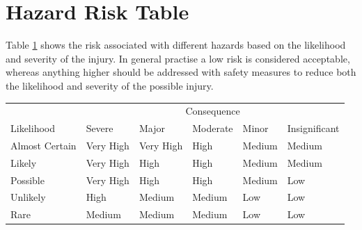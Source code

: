 \documentclass[]{report}
\begin{document}
\section{Hazard Risk Table}
Table \ref{RiskMatrixTable} shows the risk associated with different hazards based on the likelihood and severity of the injury. In general practise a low risk is considered acceptable, whereas anything higher should be addressed with safety measures to reduce both the likelihood and severity of the possible injury.

\begin{table}[h]
	\begin{tabular}{|l|lllll}
		\hline
		& \multicolumn{5}{c|}{Consequence}                                                                                                                                                                                                                           \\ \cline{2-6} 
		\multirow{-2}{*}{Likelihood} & \multicolumn{1}{l|}{\cellcolor[HTML]{FFFFFF}Severe} & \multicolumn{1}{l|}{\cellcolor[HTML]{FFFFFF}Major} & \multicolumn{1}{l|}{\cellcolor[HTML]{FFFFFF}Moderate} & \multicolumn{1}{l|}{\cellcolor[HTML]{FFFFFF}Minor} & \multicolumn{1}{l|}{Insignificant} \\ \hline
		Almost Certain               & \cellcolor[HTML]{FE0000}Very High                   & \cellcolor[HTML]{FE0000}Very High                  & \cellcolor[HTML]{F56B00}High                          & \cellcolor[HTML]{F8FF00}Medium                     & \cellcolor[HTML]{F8FF00}Medium     \\ \cline{1-1}
		Likely                       & \cellcolor[HTML]{FE0000}Very High                   & \cellcolor[HTML]{F56B00}High                       & \cellcolor[HTML]{F56B00}High                          & \cellcolor[HTML]{F8FF00}Medium                     & \cellcolor[HTML]{F8FF00}Medium     \\ \cline{1-1}
		Possible                     & \cellcolor[HTML]{FE0000}Very High                   & \cellcolor[HTML]{F56B00}High                       & \cellcolor[HTML]{F56B00}High                          & \cellcolor[HTML]{FCFF2F}Medium                     & \cellcolor[HTML]{32CB00}Low        \\ \cline{1-1}
		Unlikely                     & \cellcolor[HTML]{F56B00}High                        & \cellcolor[HTML]{F8FF00}Medium                     & \cellcolor[HTML]{F8FF00}Medium                        & \cellcolor[HTML]{32CB00}Low                        & \cellcolor[HTML]{32CB00}Low        \\ \cline{1-1}
		Rare                         & \cellcolor[HTML]{F8FF00}Medium                      & \cellcolor[HTML]{F8FF00}Medium                     & \cellcolor[HTML]{F8FF00}Medium                        & \cellcolor[HTML]{32CB00}Low                        & \cellcolor[HTML]{32CB00}Low        \\ \cline{1-1}
	\end{tabular}
	\label{RiskMatrixTable}
\end{table}
\end{document}
